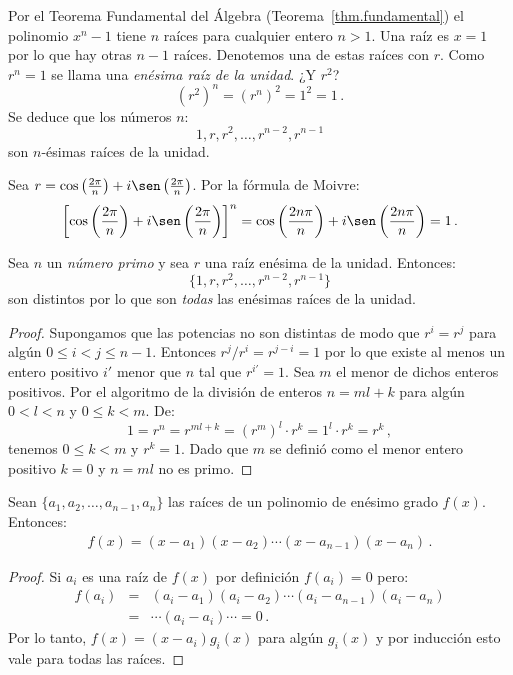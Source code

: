 Por el Teorema Fundamental del Álgebra (Teorema~\ref{thm.fundamental}) el polinomio $x^{n}-1$ tiene $n$ raíces para cualquier entero $n> 1$. Una raíz es $x=1$ por lo que hay otras $n-1$ raíces. Denotemos una de estas raíces con $r$. Como $r^{n}=1$ se llama una \emph{enésima raíz de la unidad}. ¿Y $r^2$?
\[
(r^{2})^n=(r^{n})^2=1^2=1\,.
\]
Se deduce que los números $n$:
\[
1, r, r^2, \ldots, r^{n-2}, r^{n-1}
\]
son $n$-ésimas raíces de la unidad.

\begin{advanced}
Sea $r=\cos \left(\frac{2\pi}{n}\right) + i\sen  \left(\frac{2\pi}{n}\right)$.
Por la fórmula de Moivre:
\[
\left[\cos \left(\frac{2\pi}{n}\right) + i\sen  \left(\frac{2\pi}{n}\right)\right]^{n}=
\cos \left(\frac{2 n\pi}{n}\right) + i\sen  \left(\frac{2 n\pi}{n}\right)= 1\,.
\]
\end{advanced}

\begin{theorem}
Sea $n$ un \emph{número primo} y sea $r$ una raíz enésima de la unidad. Entonces:
\[
\{1,r,r^2,\ldots,r^{n-2},r^{n-1}\}
\]
son distintos por lo que son \emph{todas} las enésimas raíces de la unidad.
\end{theorem}

\begin{proof}
Supongamos que las potencias no son distintas de modo que $r^i=r^j$ para algún $0\leq i<j\leq n-1$. Entonces $r^j/r^i=r^{j-i}=1$ por lo que existe al menos un entero positivo $i'$ menor que $n$ tal que $r^{i'}=1$. Sea $m$ el menor de dichos enteros positivos. Por el algoritmo de la división de enteros $n=ml+k$ para algún $0<l<n$ y $0\leq k<m$. De:
\[
1=r^n=r^{ml+k}=(r^m)^l\cdot r^k=1^l\cdot r^k=r^k\,,
\]
tenemos $0\leq k<m$ y $r^k=1$. Dado que $m$ se definió como el menor entero positivo $k=0$ y $n=ml$ no es primo.
\end{proof}

\begin{theorem} Sean $\{a_1,a_2,\ldots,a_{n-1},a_n\}$ las raíces de un polinomio de enésimo grado $f(x)$. Entonces:
\begin{align}\label{eq.viete}
f(x) =(x-a_1) (x-a_2)\cdots (x-a_{n-1})(x-a_n)\,.
\end{align}
\end{theorem}

\begin{proof}
Si $a_i$ es una raíz de $f(x)$ por definición $f(a_i)=0$ pero:
\begin{eqnarray*}
f(a_i)&=&(a_i-a_1) (a_i-a_2)\cdots (a_i-a_{n-1})(a_i-a_n)\\
&=&\cdots (a_i-a_i) \cdots =0\,.
\end{eqnarray*}
Por lo tanto, $f(x)=(x-a_i)g_i(x)$ para algún $g_i(x)$ y por inducción esto vale para todas las raíces.
\end{proof}


